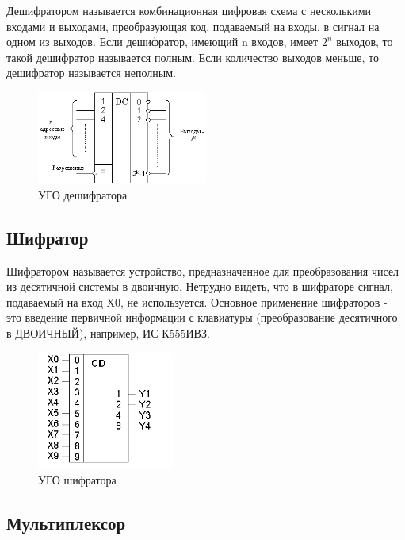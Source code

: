 \documentclass[unicode, 12pt, a4paper, oneside]{article}
\begin{document}
Дешифратором называется комбинационная цифровая схема с несколькими входами и выходами, преобразующая код, подаваемый на входы, в сигнал на одном из выходов. Если дешифратор, имеющий n входов, имеет $2^{n}$ выходов, то такой дешифратор называется полным. Если количество выходов меньше, то дешифратор называется неполным.
\begin{figure}[H]
\centering
\includegraphics[width=0.5\textwidth]{11_dc.png}
\caption{УГО дешифратора}
\label{fig:11_dc}
\end{figure}

\subsection*{Шифратор}

Шифратором называется устройство, предназначенное для преобразования чисел из десятичной системы в двоичную. Нетрудно видеть, что в шифраторе сигнал, подаваемый на вход X0, не используется. Основное применение шифраторов - это введение первичной информации с клавиатуры (преобразование десятичного в ДВОИЧНЫЙ), например, ИС К555ИВЗ.
\begin{figure}[H]
\centering
\includegraphics[width=0.4\textwidth]{11_cd.png}
\caption{УГО шифратора}
\label{fig:11_cd}
\end{figure}

\subsection*{Мультиплексор}
\end{document}
